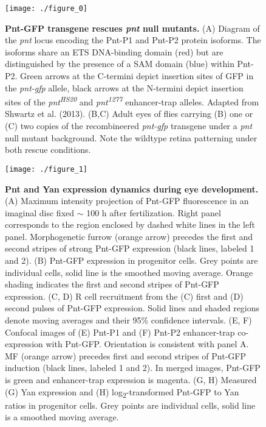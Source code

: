 \begin{figure}[h!]
\centering
\texttt{[image: ./figure\_0]}
\caption[Pnt-GFP transgene rescues \emph{pnt} null mutants.] {\textbf{Pnt-GFP transgene rescues \emph{pnt} null mutants.} (A) Diagram of the \textit{pnt} locus encoding the Pnt-P1 and Pnt-P2 protein isoforms. The isoforms share an ETS DNA-binding domain (red) but are distinguished by the presence of a SAM domain (blue) within Pnt-P2. Green arrows at the C-termini depict insertion sites of GFP in the \textit{pnt-gfp} allele, black arrows at the N-termini depict insertion sites of the \textit{pnt\textsuperscript{HS20}} and \textit{pnt\textsuperscript{1277}} enhancer-trap alleles. Adapted from Shwartz et al. (2013). (B,C) Adult eyes of flies carrying (B) one or (C) two copies of the recombineered \textit{pnt-gfp} transgene under a \textit{pnt} null mutant background. Note the wildtype retina patterning under both rescue conditions.}
\label{fig:ratio:fig0}
\end{figure}

\begin{figure}[h!]
\centering
\texttt{[image: ./figure\_1]}
\caption[Pnt and Yan expression dynamics during eye development.] {\textbf{Pnt and Yan expression dynamics during eye development.} (A) Maximum intensity projection of Pnt-GFP fluorescence in an imaginal disc fixed $\sim$ 100 h after fertilization. Right panel corresponds to the region enclosed by dashed white lines in the left panel. Morphogenetic furrow (orange arrow) precedes the first and second stripes of strong Pnt-GFP expression (black lines, labeled 1 and 2). (B) Pnt-GFP expression in progenitor cells. Grey points are individual cells, solid line is the smoothed moving average. Orange shading indicates the first and second stripes of Pnt-GFP expression. (C, D) R cell recruitment from the (C) first and (D) second pulses of Pnt-GFP expression. Solid lines and shaded regions denote moving averages and their 95\% confidence intervals. (E, F) Confocal images of (E) Pnt-P1 and (F) Pnt-P2 enhancer-trap co-expression with Pnt-GFP. Orientation is consistent with panel A. MF (orange arrow) precedes first and second stripes of Pnt-GFP induction (black lines, labeled 1 and 2). In merged images, Pnt-GFP is green and enhancer-trap expression is magenta. (G, H) Measured (G) Yan expression and (H) log\textsubscript{2}-transformed Pnt-GFP to Yan ratios in progenitor cells. Grey points are individual cells, solid line is a smoothed moving average.}
\label{fig:ratio:fig1}
\end{figure}

